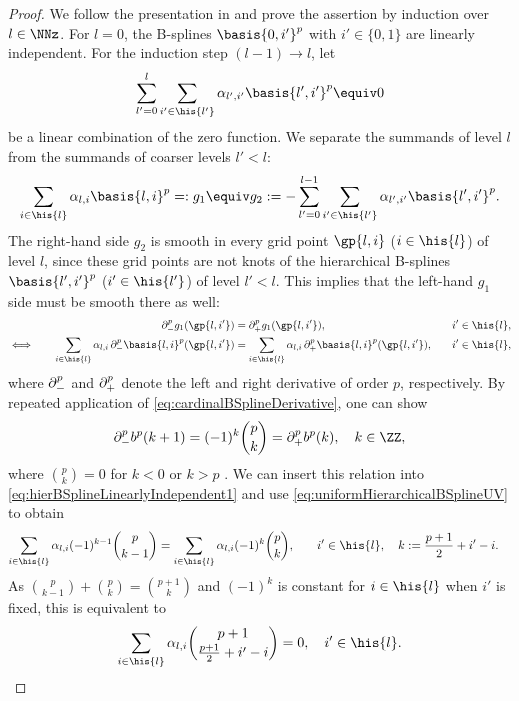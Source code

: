 \begin{proof}
  We follow the presentation in \cite{Valentin16Hierarchical} and
  prove the assertion by induction over $l \in \NNz$.
  For $l = 0$, the B-splines $\basis{0,i'}^p$ with $i' \in \{0, 1\}$
  are linearly independent.
  For the induction step $(l-1) \to l$, let
  \begin{equation}
    \sum_{l'=0}^l \sum_{i' \in \his{l'}} \alpha_{l',i'} \basis{l',i'}^p
    \equiv 0
  \end{equation}
  be a linear combination of the zero function.
  We separate the summands of level $l$
  from the summands of coarser levels $l' < l$:
  \begin{equation}
    \label{eq:hierBSplineLinearlyIndependent3}
    \sum_{i \in \his{l}} \alpha_{l,i} \basis{l,i}^p
    =: g_1 \equiv g_2 :=
    -\sum_{l'=0}^{l-1} \sum_{i' \in \his{l'}} \alpha_{l',i'} \basis{l',i'}^p.
  \end{equation}
  The right-hand side $g_2$ is smooth in every grid point
  $\gp{l,i}$ ($i \in \his{l}$) of level $l$,
  since these grid points are not knots of the hierarchical B-splines
  $\basis{l',i'}^p$ ($i' \in \his{l'}$) of level $l' < l$.
  This implies that the left-hand $g_1$ side must be smooth there as well:
  \begin{alignat}{3}
    &&
    \partialdiff_-^p g_1(\gp{l,i'})
    &= \partialdiff_+^p g_1(\gp{l,i'}),\quad
    &&i' \in \his{l},\\
    \label{eq:hierBSplineLinearlyIndependent1}
    \iff\quad&&
    \sum_{i \in \his{l}} \alpha_{l,i}
    \partialdiff_-^p \basis{l,i}^p(\gp{l,i'})
    &= \sum_{i \in \his{l}} \alpha_{l,i}
    \partialdiff_+^p \basis{l,i}^p(\gp{l,i'}),\quad
    &&i' \in \his{l},
  \end{alignat}
  where $\mathop{}\!\partial_-^p$ and $\mathop{}\!\partial_+^p$ denote the left and right
  derivative of order $p$, respectively.
  By repeated application of \eqref{eq:cardinalBSplineDerivative},
  one can show
  \begin{equation}
    \partialdiff_-^p b^p(k + 1)
    = (-1)^k \binom{p}{k}
    = \partialdiff_+^p b^p(k),\quad
    k \in \ZZ,
  \end{equation}
  where $\binom{p}{k} = 0$ for $k < 0$ or $k > p$
  \cite{Hoellig13Approximation}.
  We can insert this relation into
  \eqref{eq:hierBSplineLinearlyIndependent1}
  and use \eqref{eq:uniformHierarchicalBSplineUV} to obtain
  \begin{alignat}{2}
    \sum_{i \in \his{l}} \alpha_{l,i} (-1)^{k-1} \binom{p}{k-1}
    &= \sum_{i \in \his{l}} \alpha_{l,i} (-1)^k \binom{p}{k},\quad
    &&i' \in \his{l},\quad
    k := \frac{p+1}{2} + i' - i.
  \end{alignat}
  As $\binom{p}{k-1} + \binom{p}{k} = \binom{p+1}{k}$
  and $(-1)^k$ is constant for $i \in \his{l}$ when $i'$ is fixed,
  this is equivalent to
  \begin{equation}
    \label{eq:hierBSplineLinearlyIndependent2}
    \sum_{i \in \his{l}} \alpha_{l,i}
    \binom{p+1}{\frac{p+1}{2} + i' - i} = 0,\quad
    i' \in \his{l}.
  \end{equation}
  

\end{proof}
